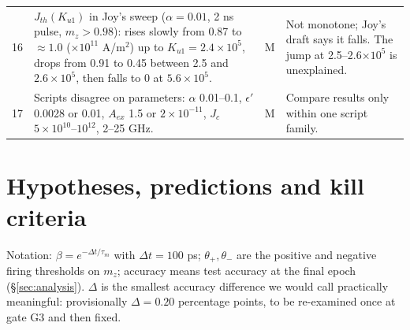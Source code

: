 \documentclass[10pt,a4paper]{article}
\newcommand{\taum}{\tau_m}
\newcommand{\ptn}{\Delta}
\begin{document}
\begin{longtable}{@{}p{0.5cm}L{7.9cm}p{0.9cm}L{5.1cm}@{}}
16 & $J_{th}(K_{u1})$ in Joy's sweep ($\alpha=0.01$, 2 ns pulse, $m_z>0.98$): rises slowly from 0.87 to $\approx1.0$ ($\times10^{11}$ A/m$^2$) up to $K_{u1}=2.4\times10^5$, drops from 0.91 to 0.45 between 2.5 and $2.6\times10^5$, then falls to 0 at $5.6\times10^5$. & M & Not monotone; Joy's draft says it falls. The jump at 2.5--2.6$\times10^5$ is unexplained.\\
17 & Scripts disagree on parameters: $\alpha$ 0.01--0.1, $\epsilon'$ 0.0028 or 0.01, $A_{ex}$ 1.5 or $2\times10^{-11}$, $J_c$ $5\times10^{10}$--$10^{12}$, 2--25 GHz. & M & Compare results only within one script family.\\
\bottomrule
\end{longtable}

\section{Hypotheses, predictions and kill criteria}\label{sec:hyp}
Notation: $\beta=e^{-\Delta t/\taum}$ with $\Delta t=100$ ps; $\theta_+,\theta_-$ are the positive and negative firing thresholds on $m_z$; accuracy means test accuracy at the final epoch (\S\ref{sec:analysis}). $\ptn$ is the smallest accuracy difference we would call practically meaningful: provisionally $\ptn=0.20$ percentage points, to be re-examined once at gate G3 and then fixed.
\end{document}
